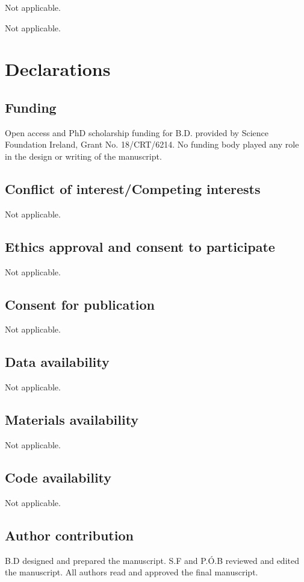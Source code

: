 \documentclass[pdflatex,sn-mathphys-num]{sn-jnl}
\begin{document}
\backmatter

Not applicable.

Not applicable. 

\section*{Declarations}

\subsection*{Funding}
Open access and PhD scholarship funding for B.D. provided by Science Foundation Ireland, Grant No. 18/CRT/6214. No funding body played any role in the design or writing of the manuscript. 
\subsection*{Conflict of interest/Competing interests}
Not applicable.
\subsection*{Ethics approval and consent to participate}
Not applicable.
\subsection*{Consent for publication}
Not applicable.
\subsection*{Data availability}
Not applicable. 
\subsection*{Materials availability}
Not applicable.
\subsection*{Code availability}
Not applicable.
\subsection*{Author contribution}
B.D designed and prepared the manuscript. S.F and P.\'{O}.B reviewed and edited the manuscript. All authors read and approved the final manuscript.



\end{document}
